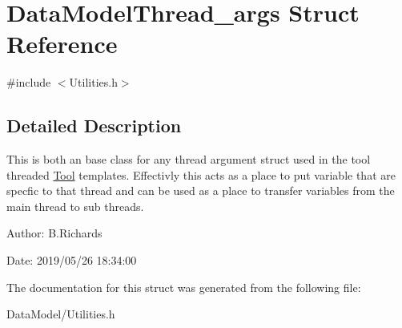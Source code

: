 \hypertarget{structDataModelThread__args}{\section{Data\-Model\-Thread\-\_\-args Struct Reference}
\label{structDataModelThread__args}
}


{\ttfamily \#include $<$Utilities.\-h$>$}



\subsection{Detailed Description}
This is both an base class for any thread argument struct used in the tool threaded \hyperlink{classTool}{Tool} templates. Effectivly this acts as a place to put variable that are specfic to that thread and can be used as a place to transfer variables from the main thread to sub threads.

\begin{DoxyParagraph}{Author\-:}
B.\-Richards 
\end{DoxyParagraph}
\begin{DoxyParagraph}{Date\-:}
2019/05/26 18\-:34\-:00 
\end{DoxyParagraph}


The documentation for this struct was generated from the following file\-:\begin{DoxyCompactItemize}
\item 
Data\-Model/Utilities.\-h\end{DoxyCompactItemize}
